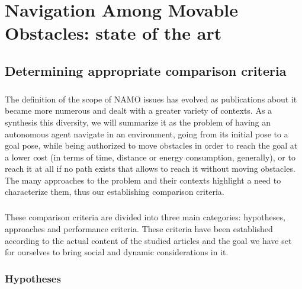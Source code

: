 
\chapter{Navigation Among Movable Obstacles: state of the art} %

\label{Chapter2} %

\section{Determining appropriate comparison criteria}

\paragraph{} The definition of the scope of NAMO issues has evolved as publications about it became more numerous and dealt with a greater variety of contexts. As a synthesis this diversity, we will summarize it as the problem of having an autonomous agent navigate in an environment, going from its initial pose to a goal pose, while being authorized to move obstacles in order to reach the goal at a lower cost (in terms of time, distance or energy consumption, generally), or to reach it at all if no path exists that allows to reach it without moving obstacles. The many approaches to the problem and their contexts highlight a need to characterize them, thus our establishing comparison criteria.

\paragraph{} These comparison criteria are divided into three main categories: hypotheses, approaches and performance criteria. These criteria have been established according to the actual content of the studied articles and the goal we have set for ourselves to bring social and dynamic considerations in it.

\subsection{Hypotheses}

